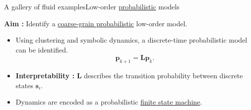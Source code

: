 \begin{frame}[t, c]{A gallery of fluid examples}{Low-order \underline{probabilistic} models}
	\begin{minipage}{.38\textwidth}
	\end{minipage}%
	\hfill
	\begin{minipage}{.58\textwidth}
		\begin{block}{}
			\centering
			\textbf{Aim :} Identify a \underline{coarse-grain probabilistic} low-order model.
		\end{block}

		\medskip

		\begin{itemize}
			\item Using clustering and symbolic dynamics, a discrete-time probabilistic model can be identified.
			\[
				\bm{p}_{k+1} = \bm{L} \bm{p}_k.
			\]

			\item \textbf{Interpretability :} \( \bm{L} \) describes the transition probability between discrete states \( \bm{s}_i \).

			\medskip

			\item Dynamics are encoded as a probabilistic \underline{finite state machine}.
		\end{itemize}
	\end{minipage}

	\vspace{1cm}
\end{frame}

